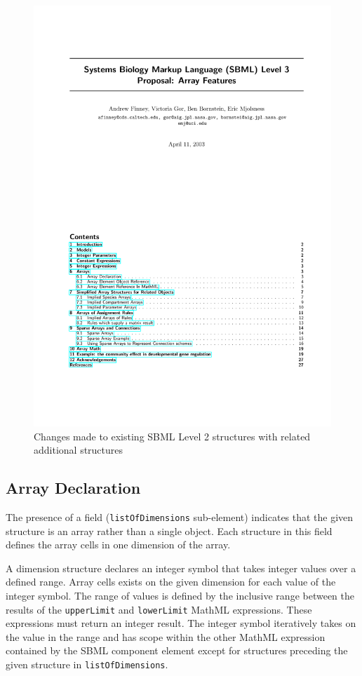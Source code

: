 \documentclass{cekarticle}
\begin{document}
\begin{figure}[htb]
  \centering
  \includegraphics[scale = 0.68]{arrays}
  \caption{Changes made to existing SBML Level 2 structures with related additional structures}
  \label{fig:arrays}
\end{figure}


\subsection{Array Declaration}
\label{sec:arraydec}
The presence of a  field
(\texttt{listOfDimensions} sub-element) indicates that the given
structure is an array rather than a single object.  Each  structure in this field defines
the array cells in one dimension of the array.

A dimension structure declares an integer symbol that takes integer values over a defined range.  
Array cells exists on the given dimension for each value of the integer symbol.  The range of values
is defined by the inclusive range between the results of the \texttt{upperLimit} and \texttt{lowerLimit}
MathML expressions.  These expressions must return an integer result.  The integer symbol iteratively takes on the
value in the range and has scope within the other MathML expression contained by the SBML component element
except for  structures preceding the given  structure in \texttt{listOfDimensions}.
\end{document}
